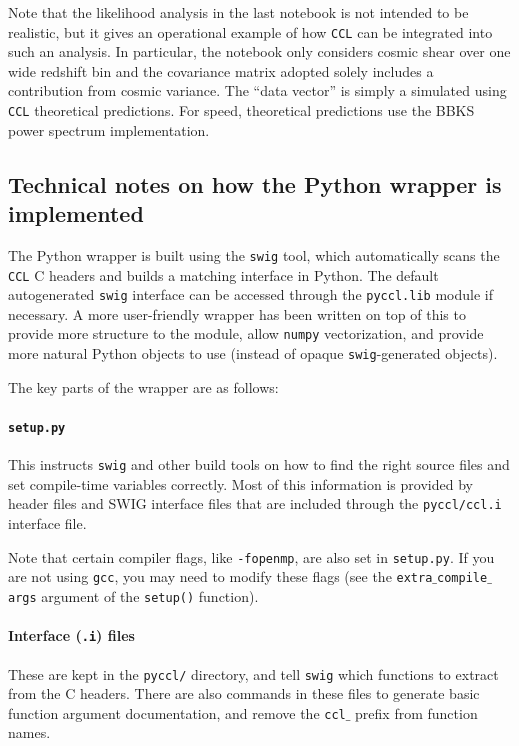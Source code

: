 \documentclass[\docopts]{\docclass}
\newcommand{\ccl}{{\tt CCL}\xspace}
\begin{document}
Note that the likelihood analysis in the last notebook is not intended to be realistic, but it gives an operational example of how {\tt CCL} can be integrated into such an analysis. In particular, the notebook only considers cosmic shear over one wide redshift bin and the covariance matrix adopted solely includes a contribution from cosmic variance. The ``data vector'' is simply a simulated using {\tt CCL} theoretical predictions. For speed, theoretical predictions use the BBKS power spectrum implementation.


\subsection{Technical notes on how the Python wrapper is implemented}
\label{sec:python:technical}

The Python wrapper is built using the {\tt swig} tool, which automatically scans the \ccl C headers and builds a matching interface in Python. The default autogenerated {\tt swig} interface can be accessed through the {\tt pyccl.lib} module if necessary. A more user-friendly wrapper has been written on top of this to provide more structure to the module, allow {\tt numpy} vectorization, and provide more natural Python objects to use (instead of opaque {\tt swig}-generated objects).

The key parts of the wrapper are as follows:
\paragraph{{\tt setup.py}} This instructs {\tt swig} and other build tools on how to find the right source files and set compile-time variables correctly. Most of this information is provided by header files and SWIG interface files that are included through the {\tt pyccl/ccl.i} interface file.

Note that certain compiler flags, like {\tt -fopenmp}, are also set in {\tt setup.py}. If you are not using {\tt gcc}, you may need to modify these flags (see the {\tt extra$\_$compile$\_$args} argument of the {\tt setup()} function).

\paragraph{Interface ({\tt .i}) files} These are kept in the {\tt pyccl/} directory, and tell {\tt swig} which functions to extract from the C headers. There are also commands in these files to generate basic function argument documentation, and remove the {\tt ccl$\_$} prefix from function names.
\end{document}
